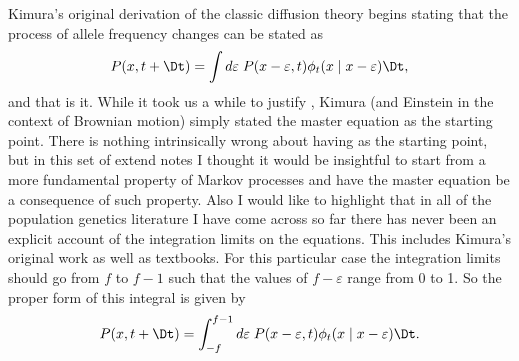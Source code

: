 Kimura's original derivation of the classic diffusion theory begins stating
that the process of allele frequency changes can be stated as
\begin{equation}
  P(x, t + \Dt) = \int d\varepsilon \;
  P(x - \varepsilon, t) \phi_t(x \mid x - \varepsilon) \Dt,
  \label{eq_kimura_master}
\end{equation}
and that is it. While it took us a while to justify ,
Kimura (and Einstein in the context of Brownian motion) simply stated the
master equation as the starting point. There is nothing intrinsically wrong
about having  as the starting point, but in this set of
extend notes I thought it would be insightful to start from a more fundamental
property of Markov processes and have the master equation be a consequence of
such property. Also I would like to highlight that in all of the population
genetics literature I have come across so far there has never been an explicit
account of the integration limits on the equations. This includes Kimura's
original work as well as textbooks. For this particular case the integration
limits should go from $f$ to $f - 1$ such that the values of $f - \varepsilon$
range from 0 to 1. So the proper form of this integral is given by
\begin{equation}
  P(x, t + \Dt) = \int_{-f}^{f - 1} d\varepsilon \;
  P(x - \varepsilon, t) \phi_t(x \mid x - \varepsilon) \Dt.
  \label{eq_kimura_master_lim}
\end{equation}

